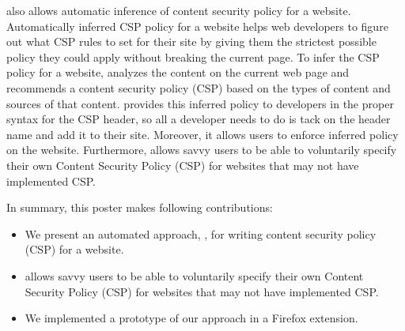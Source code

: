 \codename also allows automatic inference of content security policy
for a website. Automatically inferred CSP policy for a website helps
web developers to figure out what CSP rules to set for their site by
giving them the strictest possible policy they could apply without
breaking the current page. To infer the CSP policy for a website,
\codename analyzes the content on the current web page and recommends
a content security policy (CSP) based on the types of content and
sources of that content.  \codename provides this inferred policy to
developers in the proper syntax for the CSP header, so all a developer
needs to do is tack on the header name and add it to their
site. Moreover, it allows users to enforce inferred policy on the
website. Furthermore, \codename allows savvy users to be able to
voluntarily specify their own Content Security Policy (CSP) for
websites that may not have implemented CSP.

In summary, this poster makes following contributions:

\begin {itemize}

\item We present an automated approach, \codename, for writing
  content security policy (CSP) for a website.

\item \codename allows savvy users to be able to voluntarily specify
  their own Content Security Policy (CSP) for websites that may not
  have implemented CSP.

\item We implemented a prototype of our approach in a Firefox extension.

\end{itemize}
